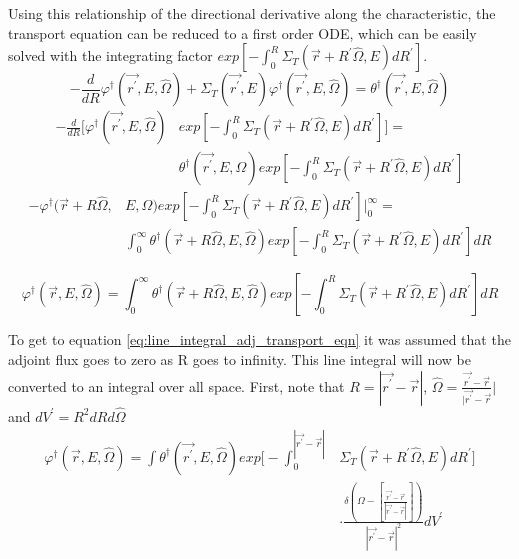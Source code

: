 Using this relationship of the directional derivative along the characteristic,
the transport equation can be reduced to a first order ODE, which can be
easily solved with the integrating factor 
$exp\left[-\int_0^R \Sigma_T(\vec{r}+R^{'}\hat{\Omega},E)dR^{'} \right]$.
\begin{equation*}
  -\frac{d}{dR}\varphi^{\dagger}(\vec{r^{'}},E,\hat{\Omega}) + 
  \Sigma_T(\vec{r^{'}},E)
  \varphi^{\dagger}(\vec{r^{'}},E,\hat{\Omega}) = 
  \theta^{\dagger}(\vec{r^{'}},E,\hat{\Omega})
\end{equation*}
\begin{equation*}
  \begin{split}
    -\frac{d}{dR}\bigg[\varphi^{\dagger}(\vec{r^{'}},E,\hat{\Omega})
      &exp\left[-\int_0^R \Sigma_T(\vec{r}+R^{'}\hat{\Omega},E)dR^{'}\right]
      \bigg] = \\
    & \theta^{\dagger}(\vec{r^{'}},E,\hat{\Omega})
    exp\left[-\int_0^R \Sigma_T(\vec{r}+R^{'}\hat{\Omega},E)dR^{'} \right]
  \end{split}
\end{equation*}
\begin{equation*}
  \begin{split}
    -\varphi^{\dagger}(\vec{r} + R\hat{\Omega},&E,\hat{\Omega})
    exp\left[-\int_0^R \Sigma_T(\vec{r}+R^{'}\hat{\Omega},E)dR^{'}\right] 
    \bigg|_0^{\infty} = \\
    & \int_0^{\infty} 
    \theta^{\dagger}(\vec{r} + R\hat{\Omega},E,\hat{\Omega})
    exp\left[-\int_0^R \Sigma_T(\vec{r}+R^{'}\hat{\Omega},E)dR^{'} \right] dR
  \end{split}
\end{equation*}

\vspace{0.5cm}
\begin{equation}
    \varphi^{\dagger}(\vec{r},E,\hat{\Omega}) = 
    \int_0^{\infty} \theta^{\dagger}(\vec{r} + R\hat{\Omega},E,\hat{\Omega})
    exp\left[-\int_0^R \Sigma_T(\vec{r}+R^{'}\hat{\Omega},E)dR^{'} \right] dR
  \label{eq:line_integral_adj_transport_eqn}
\end{equation}

To get to equation \ref{eq:line_integral_adj_transport_eqn} it was assumed that
the adjoint flux goes to zero as R goes to infinity. This line integral will
now be converted to an integral over all space. First, note that 
$R = |\vec{r^{'}} - \vec{r}|$,
$\hat{\Omega} = \frac{\vec{r^{'}} - \vec{r}}{|\vec{r^{'}} - \vec{r}}|$ and
$dV^{'} = R^2dRd\hat{\Omega}$
\begin{equation}
  \begin{split}
    \varphi^{\dagger}(\vec{r},E,\hat{\Omega}) = 
    \int \theta^{\dagger}(\vec{r^{'}},E,\hat{\Omega})
    exp\Big[-\int_0^{|\vec{r^{'}} - \vec{r}|} 
      &\Sigma_T(\vec{r}+R^{'}\hat{\Omega},E)dR^{'} \Big] \\
    &\cdot \frac{\delta \left(\Omega - \left[\frac{\vec{r^{'}} - \vec{r}}
        {|\vec{r^{'}} - \vec{r}|}\right]\right)}
    {|\vec{r^{'}} - \vec{r}|^2} dV^{'}
  \end{split}
  \label{eq:volume_integral_adj_transport_eqn}
\end{equation}

